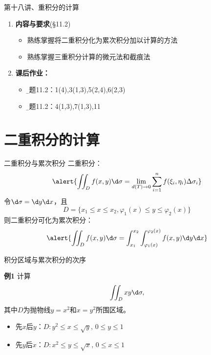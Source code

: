
\begin{frame}{第十八讲、重积分的计算}
	\linespread{1.5}
	\begin{enumerate}
	  \item {\bf 内容与要求}{\b (\S 11.2)}
	  \begin{itemize}
		\item 熟练掌握将二重积分化为累次积分加以计算的方法
	    \item 熟练掌握三重积分计算的微元法和截痕法
	  \vspace{1em}
	  \end{itemize}
	  \item {\bf  课后作业：}
	  \begin{itemize}
	    \item {\b 习题11.2：1(4),3(1,3),5(2,4),6(2,3)}
	    \item {\b 习题11.2：4(1,3),7(1,3),11}
	  \end{itemize}
	\end{enumerate}
\end{frame}

\section{二重积分的计算}

\begin{frame}{二重积分与累次积分}
	\linespread{1.2}\pause 
	{\bb 二重积分：}
	$$\alert{\iint_Df(x,y)\d\sigma=\lim_{d(T)\to
	  0}\sum_{i=1}^nf(\xi_i,\eta_i)\Delta\sigma_i}$$
	\pause 令$\d\sigma=\d y\d x$，\pause 且
	$$D=\{x_1\leq x\leq x_2,\varphi_1(x)\leq y\leq \varphi_2(x)\}$$
	\pause 则二重积分可化为{\bb 累次积分：}
	$$\alert{\iint_Df(x,y)\d\sigma=\int_{x_1}^{x_2}
	\int_{\varphi_1(x)}^{\varphi_2(x)}f(x,y)\d y\d x}$$
\end{frame}

\begin{frame}{积分区域与累次积分的次序}
	\linespread{1.2}\pause 
	\pause 
	\begin{exampleblock}{{\bf 例1}\hfill}
		计算
		$$\iint_Dxy\d\sigma,$$
		其中$D$为抛物线$y=x^2$和$x=y^2$所围区域。
	\end{exampleblock}\pause 
	\begin{itemize}
	  \item {\bb 先$x$后$y$：}$D:y^2\leq x\leq\sqrt y,\,0\leq y\leq 1$\pause 
	  \item {\bb 先$y$后$x$：}$D:x^2\leq y\leq\sqrt x,\,0\leq x\leq 1$
	\end{itemize}
\end{frame}

